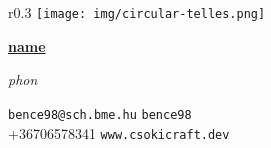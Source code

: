 \documentclass[10pt, oneside, final]{article}
\newcommand{\namestyle}{short}
\newcommand{\occupation}{\occupEmbDev}
\newcommand{\firmname}{\firmProlan}
\newcommand{\dispname}{\expandafter\csname\namestyle name\endcsname}
\newcommand{\phonetic}{\expandafter\csname\namestyle phon\endcsname}
\begin{document}
  \thispagestyle{empty}
  
  \begin{wrapfigure}{r}{0.3\textwidth}
  \texttt{[image: img/circular-telles.png]}
  \end{wrapfigure}

  \underline{\large\textsf{\textbf{\dispname}}}\vspace{2pt}\\
  {\tiny\emph{\phonetic}\par}

  {\firmname}

  \emph{\occupation}

  \vfill 
  {\faEnvelope} \texttt{bence98@sch.bme.hu} \hfill
  {\faGithub} \texttt{bence98} \\
  {\faPhone} +36{\textendash}70{\textendash}657{\textendash}8341 \hfill
  {\faGlobe} \texttt{www.csokicraft.dev}
  
\end{document}
